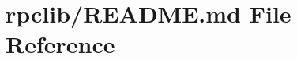 \hypertarget{rpclib_2README_8md}{}\section{rpclib/\+R\+E\+A\+D\+ME.md File Reference}
\label{rpclib_2README_8md}
